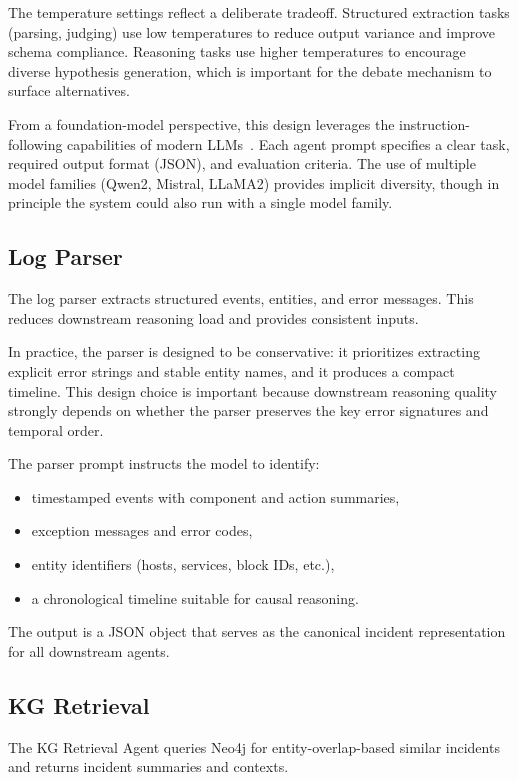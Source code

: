 The temperature settings reflect a deliberate tradeoff. Structured extraction tasks (parsing,
judging) use low temperatures to reduce output variance and improve schema compliance. Reasoning
tasks use higher temperatures to encourage diverse hypothesis generation, which is important for the
debate mechanism to surface alternatives.

From a foundation-model perspective, this design leverages the instruction-following capabilities
of modern LLMs~\cite{ouyang2022traininglanguagemodelsfollow,wei2022finetunedlanguagemodelszeroshot}.
Each agent prompt specifies a clear task, required output format (JSON), and evaluation criteria.
The use of multiple model families (Qwen2, Mistral, LLaMA2) provides implicit diversity, though in
principle the system could also run with a single model family.

\subsection{Log Parser}
The log parser extracts structured events, entities, and error messages. This reduces downstream
reasoning load and provides consistent inputs.

In practice, the parser is designed to be conservative: it prioritizes extracting explicit error
strings and stable entity names, and it produces a compact timeline. This design choice is
important because downstream reasoning quality strongly depends on whether the parser preserves
the key error signatures and temporal order.

The parser prompt instructs the model to identify:
\begin{itemize}
  \item timestamped events with component and action summaries,
  \item exception messages and error codes,
  \item entity identifiers (hosts, services, block IDs, etc.),
  \item a chronological timeline suitable for causal reasoning.
\end{itemize}
The output is a JSON object that serves as the canonical incident representation for all downstream
agents.

\subsection{KG Retrieval}
The KG Retrieval Agent queries Neo4j for entity-overlap-based similar incidents and returns
incident summaries and contexts.


